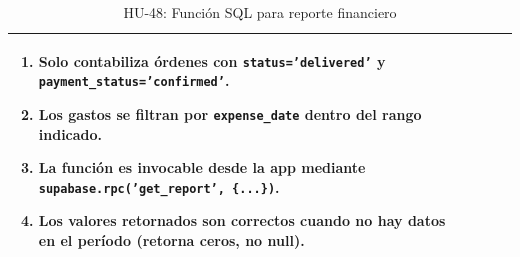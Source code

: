 \begin{table}[H]
\begin{tabularx}{\textwidth}{|>{\bfseries}p{3.5cm}|X|>{\bfseries}p{3.5cm}|X|}
{\begin{enumerate}[leftmargin=1.5em, itemsep=0pt, parsep=2pt, topsep=0pt]
    \item Solo contabiliza órdenes con \texttt{status='delivered'} y \texttt{payment\_status='confirmed'}.
    \item Los gastos se filtran por \texttt{expense\_date} dentro del rango indicado.
    \item La función es invocable desde la app mediante \texttt{supabase.rpc('get\_report', \{...\})}.
    \item Los valores retornados son correctos cuando no hay datos en el período (retorna ceros, no null).
  \end{enumerate}
} \\
\hline
\end{tabularx}
\caption{HU-48: Función SQL para reporte financiero}
\end{table}

